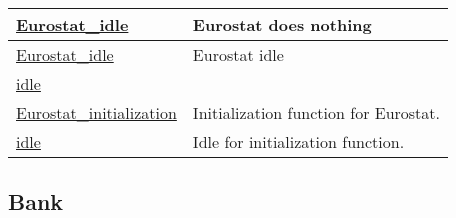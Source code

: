 \documentclass[a4paper,11pt]{article}
\begin{document}
\begin{longtable}[H!]{ll}
\midrule
\parbox{5cm}{\url{Eurostat_idle}}  & \parbox{10cm}{Eurostat does nothing} \\
\midrule
\parbox{5cm}{\url{Eurostat_idle}}  & \parbox{10cm}{Eurostat idle} \\
\midrule
\parbox{5cm}{\url{idle}}  & \parbox{10cm}{} \\
\midrule
\parbox{5cm}{\url{Eurostat_initialization}}  & \parbox{10cm}{Initialization function for Eurostat.} \\
\midrule
\parbox{5cm}{\url{idle}}  & \parbox{10cm}{Idle for initialization function.} \\
\end{longtable}

\subsection{Bank}
\end{document}
